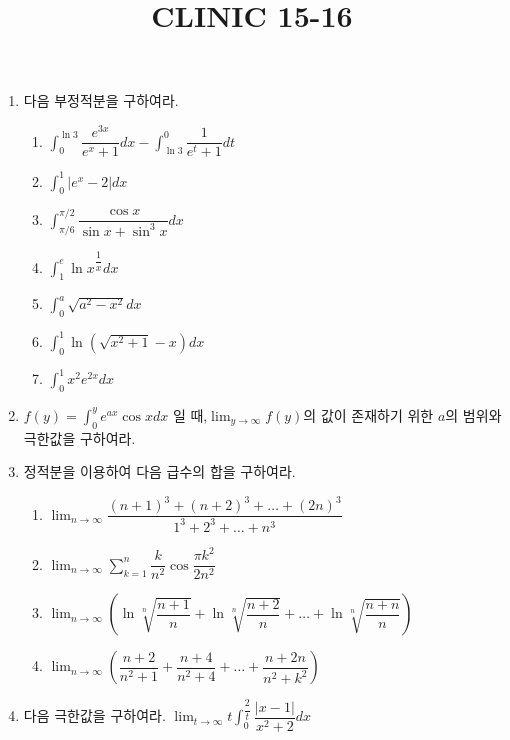\documentclass[12pt, a4paper]{article}
\title{CLINIC 15-16}
\begin{document}
\maketitle
\date{}

\begin{enumerate}
\item 다음 부정적분을 구하여라.
   \begin{enumerate}[label=(\arabic*)] 
    \item $\displaystyle\int_{0}^{\ln 3} \dfrac{e^{3x}}{e^x+1} dx - \int_{\ln 3}^{0} \dfrac{1}{e^t+1} dt$
    \item $\displaystyle\int_{0}^{1} |e^x-2| dx$
    \item $\displaystyle\int_{\pi/6}^{\pi/2} \dfrac{\cos x}{\sin x + \sin^3 x} dx$
    \item $\displaystyle\int_{1}^{e} \ln x^{\dfrac{1}{x}} dx$
    \item $\displaystyle\int_{0}^{a} \sqrt{a^2-x^2} dx$
    \item $\displaystyle\int_{0}^{1} \ln(\sqrt{x^2+1}-x) dx$
    \item $\displaystyle\int_{0}^{1} x^2 e^{2x} dx$ 
  \end{enumerate}

\item $f(y) = \displaystyle\int_{0}^{y} e^{ax}\cos x dx$ 일 때,$\displaystyle\lim_{y \to \infty} f(y)$의 값이 존재하기 위한 $a$의 범위와 극한값을 구하여라.

\item 정적분을 이용하여 다음 급수의 합을 구하여라. 
  \begin{enumerate}[label=(\arabic*)]
    \item $\displaystyle \lim_{n \to \infty} \dfrac{(n+1)^3 + (n+2)^3 + \dots + (2n)^3}{1^3 + 2^3 + \dots + n^3}$
    \item $\displaystyle \lim_{n \to \infty} \sum_{k=1}^{n} \dfrac{k}{n^2} \cos \dfrac{\pi k^2}{2n^2}$
    \item $\displaystyle \lim_{n \to \infty} (\ln \sqrt[n]{\dfrac{n+1}{n}} + \ln \sqrt[n]{\dfrac{n+2}{n}} + \dots + \ln \sqrt[n]{\dfrac{n+n}{n}})$
    \item $\displaystyle \lim_{n \to \infty} ( \dfrac{n+2}{n^2+1} + \dfrac{n+4}{n^2+4} + \dots + \dfrac{n+2n}{n^2+k^2} )$  
  \end{enumerate}

\item 다음 극한값을 구하여라. 
$\displaystyle \lim_{t \to \infty} t \int_{0}^{\dfrac{2}{t}} \dfrac{|x-1|}{x^2+2} dx$


\end{enumerate}
\end{document}
